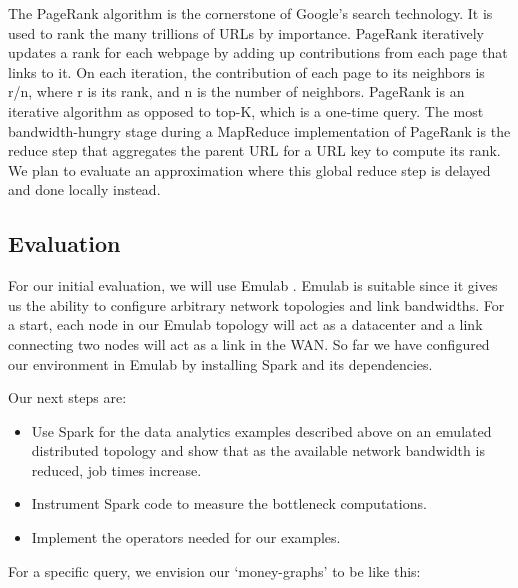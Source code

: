 \documentclass{article}
\begin{document}
The PageRank algorithm is the cornerstone of Google’s search technology. It is used to rank the many trillions of URLs by importance. PageRank iteratively updates a rank for each webpage by adding up contributions from each page that links to it. On each iteration, the contribution of each page to its neighbors is r/n, where r is its rank, and n is the number of neighbors.
PageRank is an iterative algorithm as opposed to top-K, which is a one-time query. The most bandwidth-hungry stage during a MapReduce implementation of PageRank is the reduce step that aggregates the parent URL for a URL key to compute its rank. We plan to evaluate an approximation where this global reduce step is delayed and done locally instead. 

\subsection{Evaluation}

For our initial evaluation, we will use Emulab \cite{2}. Emulab is suitable since it gives us the ability to configure arbitrary network topologies and link bandwidths. For a start, each node in our Emulab topology will act as a datacenter and a link connecting two nodes will act as a link in the WAN. So far we have configured our environment in Emulab by installing Spark and its dependencies.

Our next steps are:
\begin{itemize}
\item Use Spark for the data analytics examples described above on an emulated distributed topology and show that as the available network bandwidth is reduced, job times increase.
\item Instrument Spark code to measure the bottleneck computations.
\item Implement the operators needed for our examples.
\end{itemize}

For a specific query, we envision our ‘money-graphs’ to be like this:
\end{document}

